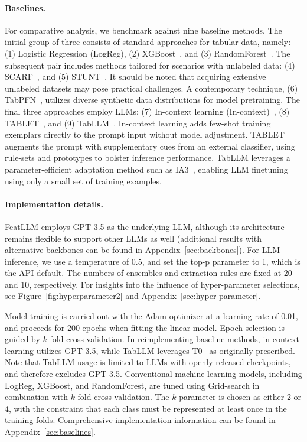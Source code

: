 \vspace*{-0.12in}
\paragraph{Baselines.}
For comparative analysis, we benchmark against nine baseline methods. The initial group of three consists of standard approaches for tabular data, namely: (1) Logistic Regression (LogReg), (2) XGBoost~\cite{chen2016xgboost}, and (3) RandomForest~\cite{ho1995random}. The subsequent pair includes methods tailored for scenarios with unlabeled data: (4) SCARF~\cite{bahri2022scarf}, and (5) STUNT~\cite{nam2023stunt}. It should be noted that acquiring extensive unlabeled datasets may pose practical challenges. A contemporary technique, (6) TabPFN~\cite{hollmann2022tabpfn}, utilizes diverse synthetic data distributions for model pretraining. The final three approaches employ LLMs: (7) In-context learning (In-context)~\cite{wei2022emergent}, (8) TABLET~\cite{slack2023tablet}, and (9) TabLLM~\cite{hegselmann2023tabllm}. In-context learning adds few-shot training exemplars directly to the prompt input without model adjustment. TABLET augments the prompt with supplementary cues from an external classifier, using rule-sets and prototypes to bolster inference performance. TabLLM leverages a parameter-efficient adaptation method such as IA3~\cite{liu2022few}, enabling LLM finetuning using only a small set of training examples.

\vspace*{-0.12in}
\paragraph{Implementation details.}
\textsf{FeatLLM} employs GPT-3.5 as the underlying LLM, although its architecture remains flexible to support other LLMs as well (additional results with alternative backbones can be found in Appendix~\ref{sec:backbones}). For LLM inference, we use a temperature of 0.5, and set the top-p parameter to 1, which is the API default. The numbers of ensembles and extraction rules are fixed at 20 and 10, respectively. For insights into the influence of hyper-parameter selections, see Figure~\ref{fig:hyperparameter2} and Appendix~\ref{sec:hyper-parameter}. 

Model training is carried out with the Adam optimizer at a learning rate of 0.01, and proceeds for 200 epochs when fitting the linear model. Epoch selection is guided by $k$-fold cross-validation. In reimplementing baseline methods, in-context learning utilizes GPT-3.5, while TabLLM leverages T0~\cite{sanh2022multitask} as originally prescribed. Note that TabLLM usage is limited to LLMs with openly released checkpoints, and therefore excludes GPT-3.5. Conventional machine learning models, including LogReg, XGBoost, and RandomForest, are tuned using Grid-search in combination with $k$-fold cross-validation. The $k$ parameter is chosen as either 2 or 4, with the constraint that each class must be represented at least once in the training folds. Comprehensive implementation information can be found in Appendix~\ref{sec:baselines}.

